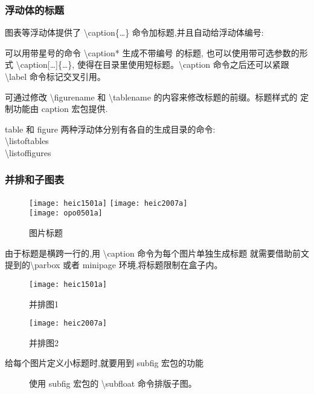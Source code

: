 \documentclass[a4paper]{ctexart}
\begin{document}
    \subsubsection{浮动体的标题}
    图表等浮动体提供了 \textbackslash caption\{\ldots\} 命令加标题,并且自动给浮动体编号:\par
    可以用带星号的命令 \textbackslash caption* 生成不带编号 的标题,%
    也可以使用带可选参数的形式 \textbackslash caption[\ldots]\{\ldots\},
    使得在目录里使用短标题。\textbackslash caption 命令之后还可以紧跟 %
    \textbackslash label 命令标记交叉引用。\par
    可通过修改 \textbackslash figurename 和 \textbackslash tablename %
    的内容来修改标题的前缀。标题样式的 定制功能由 caption 宏包提供.\par
    table 和 figure 两种浮动体分别有各自的生成目录的命令:\\
    \textbackslash listoftables\\
    \textbackslash listoffigures\par    
    \subsubsection{并排和子图表}
    \begin{figure}[htbp]
        \centering
        \texttt{[image: heic1501a]}
        \qquad
        \texttt{[image: heic2007a]}\\
        \texttt{[image: opo0501a]}
        \caption{图片标题}
        \label{}
    \end{figure}
    由于标题是横跨一行的,用 \textbackslash caption 命令为每个图片单独生成标题%
    就需要借助前文提到的\textbackslash parbox 或者 minipage 环境,将标题限制在盒子内。\par
    \begin{figure}[htbp]
        \centering
        \begin{minipage}[b][120pt][t]{0.45\linewidth}
            \centering
            \texttt{[image: heic1501a]}
            \caption{并排图1}
        \end{minipage}
        \qquad
        \begin{minipage}[b][120pt][t]{0.45\linewidth}
            \centering
            \texttt{[image: heic2007a]}
            \caption{并排图2}
        \end{minipage}
    \end{figure}     
    给每个图片定义小标题时,就要用到 subfig 宏包的功能    
    \begin{figure}[htbp]
        \centering
        \qquad
        \caption{使用 subfig 宏包的 \textbackslash subfloat 命令排版子图。}
    \end{figure}
\end{document}
